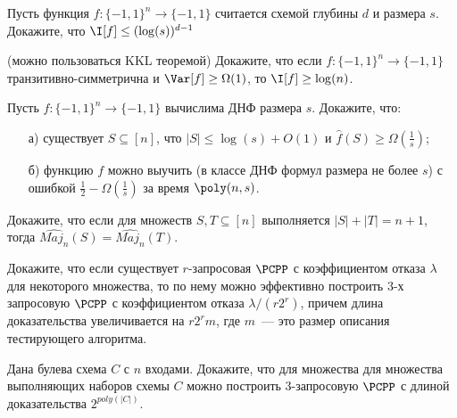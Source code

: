 \breakline

\begin{ptask}{25}
    Пусть функция $f: \{-1, 1\}^n \to \{-1, 1\}$ считается схемой глубины $d$ и размера $s$. Докажите, что $\I[f] \le
    (\log(s))^{d - 1}$
\end{ptask}

\begin{ptask}{26}(можно пользоваться KKL теоремой)
    Докажите, что если $f:\{-1, 1\}^n \to \{-1, 1\}$ транзитивно-симметрична и $\Var[f] \ge \Omega(1)$, то $\I[f] \ge \log(n)$. 
\end{ptask}


\begin{ptask}{27}
    Пусть $f:\{-1, 1\}^n \to \{-1, 1\}$ вычислима ДНФ размера $s$. Докажите, что:
   	\begin{enumerate}[topsep = 0pt, itemsep = -1ex]
        \item [а)] существует $S \subseteq [n]$, что $|S| \le \log(s) + O(1)$ и $\hat{f}(S) \ge \Omega(\frac{1}{s})$;
        \item [б)] функцию $f$ можно выучить (в классе ДНФ формул размера не более $s$) с ошибкой $\frac{1}{2} -
            \Omega(\frac{1}{s})$ за время $\poly(n, s)$.
	\end{enumerate}
\end{ptask}

\begin{ptask}{28}
    Докажите, что если для множеств $S, T \subseteq [n]$ выполняется $|S| + |T| = n + 1$, тогда $\widehat{Maj_n}(S) =
    \widehat{Maj_n}(T)$.
\end{ptask}

\begin{ptask}{30}
    Докажите, что если существует $r$-запросовая $\PCPP$ с коэффициентом отказа $\lambda$ для некоторого множества, то по нему
    можно эффективно построить $3$-х запросовую $\PCPP$ с коэффициентом отказа $\lambda / (r 2^r)$, причем длина доказательства
    увеличивается на $r 2^rm$, где $m$~--- это размер описания тестирующего алгоритма.
\end{ptask}


\begin{ptask}{34}
    Дана булева схема $C$ с $n$ входами. Докажите, что для множества для множества выполняющих наборов схемы $C$ можно построить
    $3$-запросовую $\PCPP$ с длиной доказательства $2^{poly (|C|)}$.
\end{ptask}




